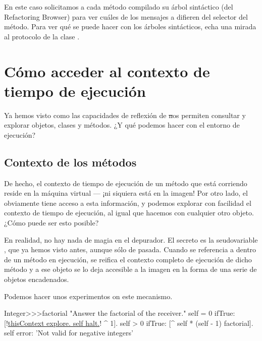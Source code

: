 \documentclass[a4paper,10pt,twoside]{book}
\begin{document}
En este caso solicitamos a cada m\'etodo compilado su \'arbol sint\'actico
(del Refactoring Browser) para ver cu\'ales de los mensajes a \super
difieren del selector del m\'etodo.  Para ver qu\'e se puede hacer con los
\'arboles sint\'acticos, echa una mirada al protocolo  de
la clase .

\section{C\'omo acceder al contexto de tiempo de ejecuci\'on}

Ya hemos visto como las capacidades de reflexi\'on de \st nos permiten
consultar y explorar objetos, clases y m\'etodos.  ¿Y qu\'e podemos hacer
con el entorno de ejecuci\'on?

\subsection{Contexto de los m\'etodos}

De hecho, el contexto de tiempo de ejecuci\'on de un m\'etodo que est\'a
corriendo reside en la m\'aquina virtual --- ¡ni siquiera est\'a en la
imagen!  Por otro lado, el  obviamente tiene acceso a
esta informaci\'on, y podemos explorar con facilidad el contexto de
tiempo de ejecuci\'on, al igual que hacemos con cualquier otro objeto.
¿C\'omo puede ser esto posible?

En realidad, no hay nada de magia en el depurador.  El secreto es la
seudovariable , que ya hemos visto antes, aunque
s\'olo de pasada.  Cuando se referencia a  dentro de un
m\'etodo en ejecuci\'on, se reifica el contexto completo de ejecuci\'on de
dicho m\'etodo y a ese objeto se lo deja accesible a la imagen en la
forma de una serie de objetos  encadenados.

Podemos hacer unos experimentos on este mecanismo.


\begin{code}{}
Integer>>>factorial
        "Answer the factorial of the receiver."
        self = 0 ifTrue: [!\underline{thisContext explore. self halt.}! ^ 1].
        self > 0 ifTrue: [^ self * (self - 1) factorial].
        self error: 'Not valid for negative integers'
\end{code}
\end{document}
